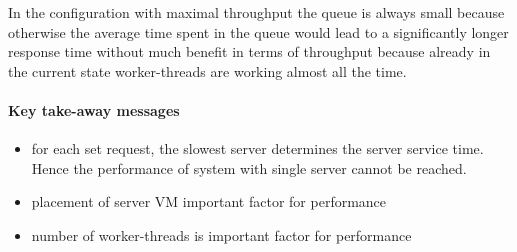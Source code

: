 \documentclass[report.tex]{subfiles}
\begin{document}
In the configuration with maximal throughput the queue is always small because otherwise the average time spent in the queue would lead to a significantly longer response time without much benefit in terms of throughput because already in the current state worker-threads are working almost all the time. 


\paragraph{Key take-away messages}
\begin{itemize}
	\item for each set request, the slowest server determines the server service time. Hence the performance of system with single server cannot be reached.
	\item placement of server VM important factor for performance
	\item number of worker-threads is important factor for performance
\end{itemize}
\end{document}
